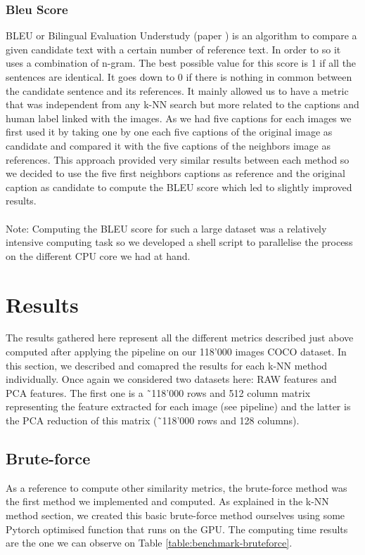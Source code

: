 \documentclass[a4paper]{article}
\begin{document}
	\subsubsection{Bleu Score}
		BLEU or Bilingual Evaluation Understudy (paper \cite{BLEU}) is an algorithm to compare a given candidate text with a certain number of reference text. In order to so it uses a combination of n-gram. The best possible value for this score is 1 if all the sentences are identical. It goes down to 0 if there is nothing in common between the candidate sentence and its references. It mainly allowed us to have a metric that was independent from any k-NN search but more related to the captions and human label linked with the images. As we had five captions for each images we first used it by taking one by one each five captions of the original image as candidate and compared it with the five captions of the neighbors image as references. This approach provided very similar results between each method so we decided to use the five first neighbors captions as reference and the original caption as candidate to compute the BLEU score which led to slightly improved results.
		\\
		\\
		Note: Computing the BLEU score for such a large dataset was a relatively intensive computing task so we developed a shell script to parallelise the process on the different CPU core we had at hand.
		
\section{Results}
The results gathered here represent all the different metrics described just above computed after applying the pipeline on our 118'000 images COCO dataset. In this section, we described and comapred the results for each k-NN method  individually. Once again we considered two datasets here: RAW features and PCA features. The first one is a ˜118'000 rows and 512 column matrix representing the feature extracted for each image (see pipeline) and the latter is the PCA reduction of this matrix (˜118'000 rows and 128 columns).

	\subsection{Brute-force}
	
	As a reference to compute other similarity metrics, the brute-force method was the first method we implemented and computed. As explained in the k-NN method section, we created this basic brute-force method ourselves using some Pytorch optimised function that runs on the GPU. The computing time results are the one we can observe on Table \ref{table:benchmark-bruteforce}.
	
\end{document}
